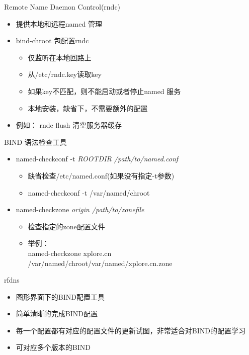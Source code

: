 \begin{frame}{Remote Name Daemon Control(rndc)}
\begin{itemize}
\item 提供本地和远程named 管理
\item bind-chroot 包配置rndc

\begin{itemize}
\item 仅监听在本地回路上
\item 从/etc/rndc.key读取key
\item 如果key不匹配，则不能启动或者停止named 服务
\item 本地安装，缺省下，不需要额外的配置
\end{itemize}
\item 例如： rndc flush 清空服务器缓存
\end{itemize}

\end{frame} 
\begin{frame}{BIND 语法检查工具}


\begin{itemize}
\item named-checkconf -t \emph{ROOTDIR /path/to/named.conf}

\begin{itemize}
\item 缺省检查/etc/named.conf(如果没有指定-t参数)
\item named-checkconf -t /var/named/chroot
\end{itemize}
\item named-checkzone \emph{origin /path/to/zonefile}

\begin{itemize}
\item 检查指定的zone配置文件
\item 举例：\\
named-checkzone xplore.cn /var/named/chroot/var/named/xplore.cn.zone
\end{itemize}
\end{itemize}

\end{frame} 
\begin{frame}{rfdns}
\begin{itemize}
\item 图形界面下的BIND配置工具
\item 简单清晰的完成BIND配置
\item 每一个配置都有对应的配置文件的更新试图，非常适合对BIND的配置学习
\item 可对应多个版本的BIND
\end{itemize}

\end{frame} 
